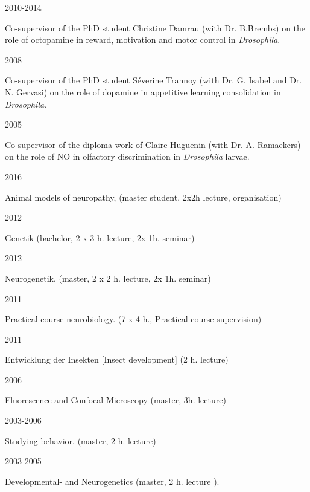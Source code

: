\parbox{0.15\textwidth}{2010-2014}\hfill
	\parbox[t]{0.83\textwidth}{Co-supervisor of the PhD student Christine Damrau
(with Dr. B.Brembs) on the role of octopamine in reward, motivation and motor control in  \textit{Drosophila}.}
\parbox{0.15\textwidth}{2008}\hfill
	\parbox[t]{0.83\textwidth}{Co-supervisor of the PhD student S\'everine Trannoy
(with Dr. G. Isabel and Dr. N. Gervasi) on the role of dopamine in appetitive learning consolidation in  \textit{Drosophila}.}
\parbox{0.15\textwidth}{2005}\hfill
\parbox[t]{0.83\textwidth}{Co-supervisor of the diploma work of Claire Huguenin
(with Dr. A. Ramaekers) on the role of NO in olfactory discrimination in \textit{Drosophila} larvae.}





\parbox{0.15\textwidth}{2016}\hfill
\parbox[t]{0.83\textwidth}{Animal models of neuropathy, (master student, 2x2h lecture, organisation)}
%
\parbox{0.15\textwidth}{2012}\hfill
\parbox[t]{0.83\textwidth}{Genetik (bachelor, 2 x 3 h. lecture, 2x 1h. seminar)}
\parbox{0.15\textwidth}{2012}\hfill
\parbox[t]{0.83\textwidth}{Neurogenetik. (master, 2 x 2 h. lecture, 2x 1h. seminar)}
\parbox{0.15\textwidth}{2011}\hfill
\parbox[t]{0.83\textwidth}{Practical course neurobiology. (7 x 4 h., Practical course supervision)}
\parbox{0.15\textwidth}{2011}\hfill
\parbox[t]{0.83\textwidth}{Entwicklung der Insekten [Insect development] (2 h. lecture)}
\parbox{0.15\textwidth}{2006}\hfill
\parbox[t]{0.83\textwidth}{Fluorescence and Confocal Microscopy (master, 3h. lecture)}
\parbox{0.15\textwidth}{2003-2006}\hfill
\parbox[t]{0.83\textwidth}{Studying behavior. (master, 2 h. lecture)}
\parbox{0.15\textwidth}{2003-2005}\hfill
\parbox[t]{0.83\textwidth}{Developmental- and Neurogenetics %
(master, 2 h. lecture%
).}


%
%
%
%
%
%
%
%
%
%
%
%
%


